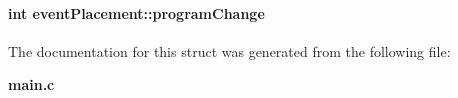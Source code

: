\paragraph[{program\+Change}]{\setlength{\rightskip}{0pt plus 5cm}int event\+Placement\+::program\+Change}\label{structevent_placement_a047734cc2a3854a154c3717479cf88b0}


The documentation for this struct was generated from the following file\+:\begin{DoxyCompactItemize}
\item 
{\bf main.\+c}\end{DoxyCompactItemize}
